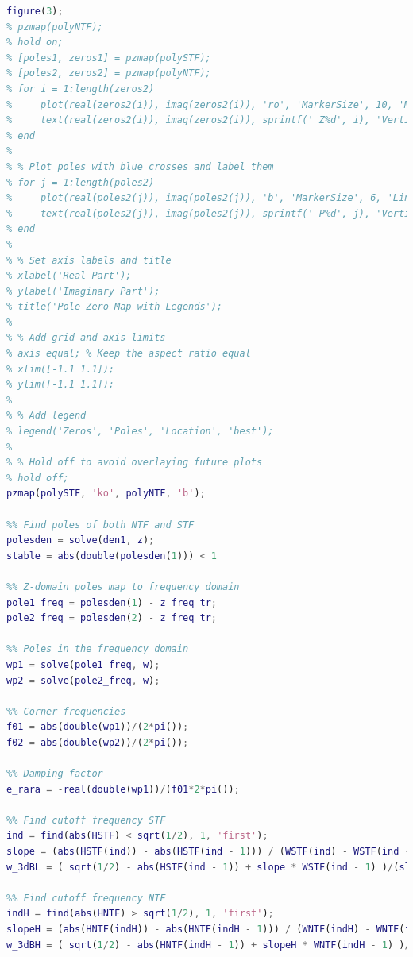 \begin{lstlisting}[language=Matlab, basicstyle=\ttfamily\small, breaklines=true, frame=single]
%% Zero plot for NTF and STF
figure(3);
% pzmap(polyNTF);
% hold on;
% [poles1, zeros1] = pzmap(polySTF);
% [poles2, zeros2] = pzmap(polyNTF);
% for i = 1:length(zeros2)
%     plot(real(zeros2(i)), imag(zeros2(i)), 'ro', 'MarkerSize', 10, 'MarkerFaceColor', 'r');
%     text(real(zeros2(i)), imag(zeros2(i)), sprintf(' Z%d', i), 'VerticalAlignment', 'bottom', 'HorizontalAlignment', 'right', 'Color', 'r');
% end
% 
% % Plot poles with blue crosses and label them
% for j = 1:length(poles2)
%     plot(real(poles2(j)), imag(poles2(j)), 'b', 'MarkerSize', 6, 'LineWidth', 1.5);
%     text(real(poles2(j)), imag(poles2(j)), sprintf(' P%d', j), 'VerticalAlignment', 'top', 'HorizontalAlignment', 'left', 'Color', 'b');
% end
% 
% % Set axis labels and title
% xlabel('Real Part');
% ylabel('Imaginary Part');
% title('Pole-Zero Map with Legends');
% 
% % Add grid and axis limits
% axis equal; % Keep the aspect ratio equal
% xlim([-1.1 1.1]);
% ylim([-1.1 1.1]);
% 
% % Add legend
% legend('Zeros', 'Poles', 'Location', 'best');
% 
% % Hold off to avoid overlaying future plots
% hold off;
pzmap(polySTF, 'ko', polyNTF, 'b');

%% Find poles of both NTF and STF
polesden = solve(den1, z);
stable = abs(double(polesden(1))) < 1

%% Z-domain poles map to frequency domain
pole1_freq = polesden(1) - z_freq_tr; 
pole2_freq = polesden(2) - z_freq_tr;

%% Poles in the frequency domain
wp1 = solve(pole1_freq, w);
wp2 = solve(pole2_freq, w);

%% Corner frequencies 
f01 = abs(double(wp1))/(2*pi());
f02 = abs(double(wp2))/(2*pi());

%% Damping factor
e_rara = -real(double(wp1))/(f01*2*pi());

%% Find cutoff frequency STF
ind = find(abs(HSTF) < sqrt(1/2), 1, 'first');
slope = (abs(HSTF(ind)) - abs(HSTF(ind - 1))) / (WSTF(ind) - WSTF(ind - 1));
w_3dBL = ( sqrt(1/2) - abs(HSTF(ind - 1)) + slope * WSTF(ind - 1) )/(slope);

%% Find cutoff frequency NTF
indH = find(abs(HNTF) > sqrt(1/2), 1, 'first');
slopeH = (abs(HNTF(indH)) - abs(HNTF(indH - 1))) / (WNTF(indH) - WNTF(indH - 1));
w_3dBH = ( sqrt(1/2) - abs(HNTF(indH - 1)) + slopeH * WNTF(indH - 1) )/(slopeH);

\end{lstlisting}

\newpage

